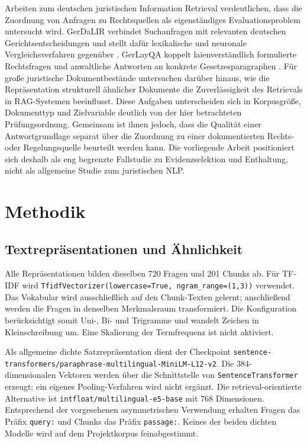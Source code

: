 \documentclass[11pt]{article}
\begin{document}
Arbeiten zum deutschen juristischen Information Retrieval verdeutlichen, dass die Zuordnung von Anfragen zu Rechtsquellen als eigenständiges Evaluationsproblem untersucht wird. GerDaLIR verbindet Suchanfragen mit relevanten deutschen Gerichtsentscheidungen und stellt dafür lexikalische und neuronale Vergleichsverfahren gegenüber \citep{wrzalik-krechel-2021-gerdalir}. GerLayQA koppelt laienverständlich formulierte Rechtsfragen und anwaltliche Antworten an konkrete Gesetzesparagraphen \citep{buttner-habernal-2024-answering}. Für große juristische Dokumentbestände untersuchen \citet{reuter-etal-2025-towards} darüber hinaus, wie die Repräsentation strukturell ähnlicher Dokumente die Zuverlässigkeit des Retrievals in RAG-Systemen beeinflusst. Diese Aufgaben unterscheiden sich in Korpusgröße, Dokumenttyp und Zielvariable deutlich von der hier betrachteten Prüfungsordnung. Gemeinsam ist ihnen jedoch, dass die Qualität einer Antwortgrundlage separat über die Zuordnung zu einer dokumentierten Rechts- oder Regelungsquelle beurteilt werden kann. Die vorliegende Arbeit positioniert sich deshalb als eng begrenzte Fallstudie zu Evidenzselektion und Enthaltung, nicht als allgemeine Studie zum juristischen NLP.


\section{Methodik}

\subsection{Textrepräsentationen und Ähnlichkeit}

Alle Repräsentationen bilden dieselben 720 Fragen und 201 Chunks ab. Für TF-IDF wird \texttt{TfidfVectorizer(lowercase=True, ngram\_range=(1,3))} verwendet. Das Vokabular wird ausschließlich auf den Chunk-Texten gelernt; anschließend werden die Fragen in denselben Merkmalsraum transformiert. Die Konfiguration berücksichtigt somit Uni-, Bi- und Trigramme und wandelt Zeichen in Kleinschreibung um. Eine Skalierung der Termfrequenz ist nicht aktiviert.

Als allgemeine dichte Satzrepräsentation dient der Checkpoint \nolinkurl{sentence-transformers/paraphrase-multilingual-MiniLM-L12-v2}. Die 384-dimensionalen Vektoren werden über die Schnittstelle von \texttt{SentenceTransformer} erzeugt; ein eigenes Pooling-Verfahren wird nicht ergänzt. Die retrieval-orientierte Alternative ist \texttt{intfloat/multilingual-e5-base} mit 768 Dimensionen. Entsprechend der vorgesehenen asymmetrischen Verwendung erhalten Fragen das Präfix \texttt{query:} und Chunks das Präfix \texttt{passage:}. Keines der beiden dichten Modelle wird auf dem Projektkorpus feinabgestimmt.
\end{document}
